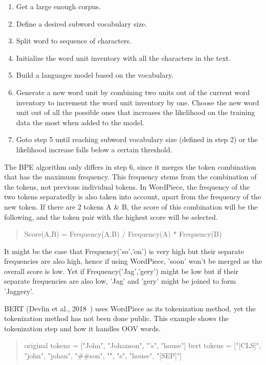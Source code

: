 \begin{enumerate}
    \item Get a large enough corpus.
    \item Define a desired subword vocabulary size.
    \item Split word to sequence of characters.
    \item Initialize the word unit inventory with all the characters in the text.
    \item Build a languages model based on the vocabulary.
    \item Generate a new word unit by combining two units out of the current word inventory to increment the word unit inventory by one. Choose the new word unit out of all the possible ones that increases the likelihood on the training data the most when added to the model.
    \item Goto step 5 until reaching subword vocabulary size (defined in step 2) or the likelihood increase falls below a certain threshold.
\end{enumerate}

The BPE algorithm only differs in step 6, since it merges the token combination that has the maximum frequency. This frequency stems from the combination of the tokens, not previous individual tokens. In WordPiece, the frequency of the two tokens separatedly is also taken into account, apart from the frequency of the new token. If there are 2 tokens A \& B, the score of this combination will be the following, and the token pair with the highest score will be selected.

\begin{quote}
    Score(A,B) = Frequency(A,B) / Frequency(A) * Frequency(B)
\end{quote}

It might be the case that Frequency('so','on') is very high but their separate frequencies are also high, hence if using WordPiece, 'soon' won't be merged as the overall score is low. Yet if Frequency('Jag','gery') might be low but if their separate frequencies are also low, 'Jag' and 'gery' might be joined to form 'Jaggery'.

BERT (Devlin et al., 2018~\cite{devlin2018bert}) uses WordPiece as its tokenization method, yet the tokenization method has not been done public. This example shows the tokenization step and how it handles OOV words.

\begin{quote}
    original tokens = ["John", "Johanson", "'s",  "house"]
    bert tokens = ["[CLS]", "john", "johan", "\#\#son", "\'", "s", "house", "[SEP]"]
\end{quote}

